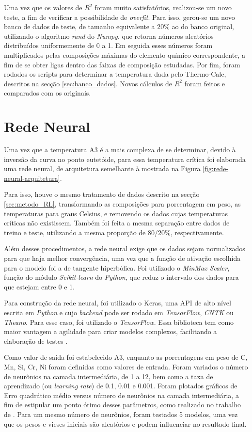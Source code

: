 \documentclass[brazil,tf,epusp]{usp}  %
\begin{document}
Uma vez que os valores de $R^{2}$ foram muito satisfatórios, realizou-se um novo teste, a fim de verificar a possibilidade de \textit{overfit}. Para isso, gerou-se um novo banco de dados de teste, de tamanho equivalente a 20\% ao do banco original, utilizando o algoritmo \textit{rand} do \textit{Numpy}, que retorna números aleatórios distribuídos uniformemente de 0 a 1. Em seguida esses números foram multiplicados pelas composições máximas do elemento químico correspondente, a fim de se obter ligas dentro das faixas de composição estudadas. Por fim, foram rodados os scripts para determinar a temperatura dada pelo Thermo-Calc\textregistered{}, descritos na secção \ref{sec:banco_dados}. Novos cálculos de $R^{2}$ foram feitos e comparados com os originais.

\section{Rede Neural}
Uma vez que a temperatura A3 é a mais complexa de se determinar, devido à inversão da curva no ponto eutetóide, para essa temperatura crítica foi elaborada uma rede neural, de arquitetura semelhante à mostrada na Figura \ref{fig:rede-neural-arquitetura}.

Para isso, houve o mesmo tratamento de dados descrito na secção \ref{sec:metodo_RL}, transformando as composições para porcentagem em peso, as temperaturas para graus Celsius, e removendo os dados cujas temperaturas críticas não existissem. Também foi feita a mesma separação entre dados de treino e teste, utilizando a mesma proporção de 80/20\%, respectivamente.

Além desses procedimentos, a rede neural exige que os dados sejam normalizados para que haja melhor convergência, uma vez que a função de ativação escolhida para o modelo foi a de tangente hiperbólica. Foi utilizado o \textit{MinMax Scaler}, função do módulo \textit{Scikit-learn} do \textit{Python}, que reduz o intervalo dos dados para que estejam entre 0 e 1.

Para construção da rede neural, foi utilizado o Keras, uma API de alto nível escrita em \textit{Python} e cujo
\textit{backend} pode ser rodado em \textit{TensorFlow}, \textit{CNTK} ou \textit{Theano}. Para esse caso, foi utilizado o \textit{TensorFlow}. Essa biblioteca tem como maior vantagem a agilidade para criar modelos complexos, facilitando a elaboração de testes \cite{Skalski2017}.

Como valor de saída foi estabelecido A3, enquanto as porcentagens em peso de C, Mn, Si, Cr, Ni foram definidas como valores de entrada. Foram variados o número de neurônios na camada intermediária, de 1 a 12, bem como a taxa de aprendizado (ou \textit{learning rate}) de 0.1, 0.01 e 0.001. Foram plotados gráficos de Erro quadrático médio versus número de neurônios na camada intermediária, a fim de estipular um ponto ótimo desses parâmetros, como realizado no trabalho de . Para um mesmo número de neurônios, foram testados 5 modelos, uma vez que os pesos e vieses iniciais são aleatórios e podem influenciar no resultado final.
\end{document}
